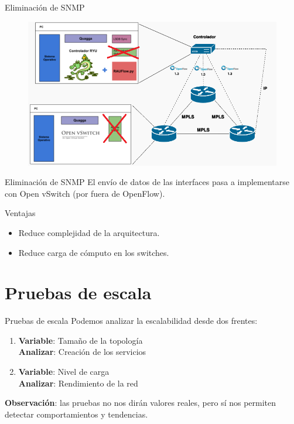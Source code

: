 \documentclass[xcolor=svgnames]{beamer}
\begin{document}
\begin{frame}{Eliminación de SNMP}
	\begin{figure}[t]
		\centering
		\includegraphics[scale=0.5]{componentes_rauflow_2}
	\end{figure}
\end{frame}

\begin{frame}{Eliminación de SNMP}
	El envío de datos de las interfaces pasa a implementarse con Open vSwitch (por fuera de OpenFlow).
	\begin{exampleblock}{Ventajas}
		\begin{itemize}
			\item Reduce complejidad de la arquitectura.
			\item Reduce carga de cómputo en los switches.
		\end{itemize}
	\end{exampleblock}
\end{frame}

\section{Pruebas de escala}

\begin{frame}{}
	\tableofcontents[currentsection]
\end{frame}

\begin{frame}{Pruebas de escala}
	Podemos analizar la escalabilidad desde dos frentes:
	\begin{enumerate}
		\item \textbf{Variable}: Tamaño de la topología \\
		\textbf{Analizar}: Creación de los servicios
		\item \textbf{Variable}: Nivel de carga \\
		\textbf{Analizar}: Rendimiento de la red \\
	\end{enumerate}
	\pause
	\vspace{4mm}
	\textbf{Observación}: las pruebas no nos dirán valores reales, pero sí nos permiten detectar comportamientos y tendencias.
\end{frame}
\end{document}
